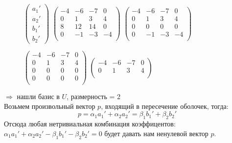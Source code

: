 \documentclass[10pt]{article}
\begin{document}
\begin{figure}[H]
$\begin{pmatrix}
a_1' \\
a_2' \\
b_1' \\
b_2'
\end{pmatrix}$
\text{ = }
$\begin{pmatrix}
-4 & -6 & -7 & 0 \\
0 & 1 & 3 & 4 \\
8 & 12 & 14 & 0 \\
0 & -1 & -3 & -4 \\
\end{pmatrix}$
\text{ = }
$\begin{pmatrix}
-4 & -6 & -7 & 0 \\
0 & 1 & 3 & 4 \\
0 & 0 & 0 & 0 \\
0 & -1 & -3 & -4 \\
\end{pmatrix}$
\text{ = }

\text{ = }
$\begin{pmatrix}
-4 & -6 & -7 & 0 \\
0 & 1 & 3 & 4 \\
0 & 0 & 0 & 0 \\
0 & 0 & 0 & 0 \\
\end{pmatrix}$
\text{ = }
$\begin{pmatrix}
-4 & -6 & -7 & 0 \\
0 & 1 & 3 & 4 \\
\end{pmatrix}$
\end{figure}
$\Rightarrow$ нашли базис в $U$, размерность =  2 \\
Возьмем произвольный вектор $p$, входящий в пересечение оболочек, тогда:
$$
p = \alpha_1 a_1' + \alpha_2 a_2' = \beta_1 b_1' + \beta_2 b_2'
$$
Отсюда  любая нетривиальная комбинация коэффицентов: $\alpha_1 a_1' + \alpha_2 a_2' - \beta_1 b_1' - \beta_2 b_2' = 0$ будет давать нам ненулевой вектор  $p$.
\end{document}
